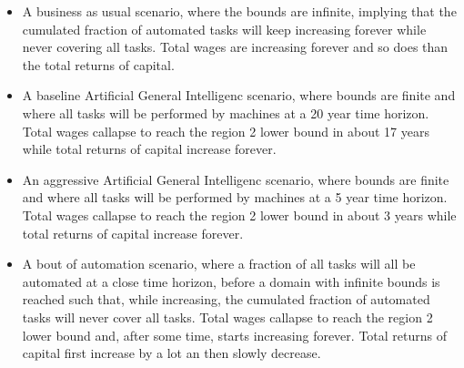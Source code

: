 \documentclass{article}
\begin{document}
\begin{itemize}
    \item A business as usual scenario, where the bounds are infinite, implying that the cumulated fraction of automated tasks will keep increasing forever while never covering all tasks. Total wages are increasing forever and so does than the total returns of capital.
    \item A baseline Artificial General Intelligenc scenario, where bounds are finite and where all tasks will be performed by machines at a 20 year time horizon. Total wages callapse to reach the region 2 lower bound in about 17 years while total returns of capital increase forever.
    \item An aggressive Artificial General Intelligenc scenario, where bounds are finite and where all tasks will be performed by machines at a 5 year time horizon. Total wages callapse to reach the region 2 lower bound in about 3 years while total returns of capital increase forever.
    \item A bout of automation scenario, where a fraction of all tasks will all be automated at a close time horizon, before a domain with infinite bounds is reached such that, while increasing, the cumulated fraction of automated tasks will never cover all tasks. Total wages callapse to reach the region 2 lower bound and, after some time, starts increasing forever. Total returns of capital first increase by a lot an then slowly decrease.
\end{itemize}
\end{document}
